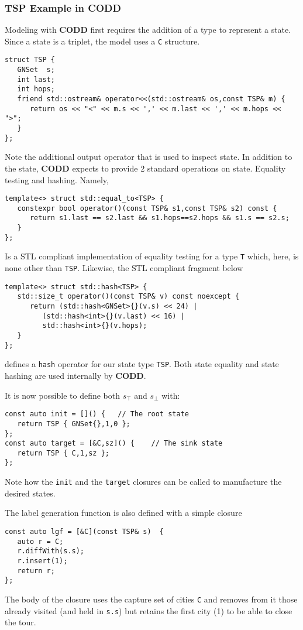 \documentclass[11pt]{article}
\begin{document}
\subsubsection{TSP Example in \textbf{CODD}}
\label{sec:orgea1e7ef}
Modeling with \textbf{CODD} first requires the addition of a type to represent a state. Since a state is a triplet, the model uses a \texttt{C} structure.

\begin{verbatim}
struct TSP {
   GNSet  s;
   int last;
   int hops;
   friend std::ostream& operator<<(std::ostream& os,const TSP& m) {
      return os << "<" << m.s << ',' << m.last << ',' << m.hops << ">";
   }
};
\end{verbatim}
Note the additional output operator that is used to inspect state.
In addition to the state, \textbf{CODD} expects to provide 2 standard operations on state. Equality testing and hashing. Namely, 
\begin{verbatim}
template<> struct std::equal_to<TSP> {
   constexpr bool operator()(const TSP& s1,const TSP& s2) const {
      return s1.last == s2.last && s1.hops==s2.hops && s1.s == s2.s;
   }
};
\end{verbatim}
Is a STL compliant implementation of equality testing for a type \texttt{T} which, here, is none other than \texttt{TSP}.
Likewise, the STL compliant fragment below
\begin{verbatim}
template<> struct std::hash<TSP> {
   std::size_t operator()(const TSP& v) const noexcept {
      return (std::hash<GNSet>{}(v.s) << 24) |
         (std::hash<int>{}(v.last) << 16) |
         std::hash<int>{}(v.hops);
   }
};
\end{verbatim}
defines a \texttt{hash} operator for our state type \texttt{TSP}.  Both state equality and state hashing are used internally by \textbf{CODD}.

It is now possible to define both \(s_\top\) and \(s_\bot\) with:
\begin{verbatim}
const auto init = []() {   // The root state
   return TSP { GNSet{},1,0 };
};
const auto target = [&C,sz]() {    // The sink state
   return TSP { C,1,sz };
};
\end{verbatim}
Note how the \texttt{init} and the \texttt{target} closures can be called to manufacture the desired states.

The label generation function is also defined with a simple closure
\begin{verbatim}
const auto lgf = [&C](const TSP& s)  {
   auto r = C;
   r.diffWith(s.s);
   r.insert(1);
   return r;
};
\end{verbatim}
The body of the closure uses the capture set of cities \texttt{C} and removes from it those already visited (and held in \texttt{s.s}) but retains the first city (1) to be able to close the tour.
\end{document}
